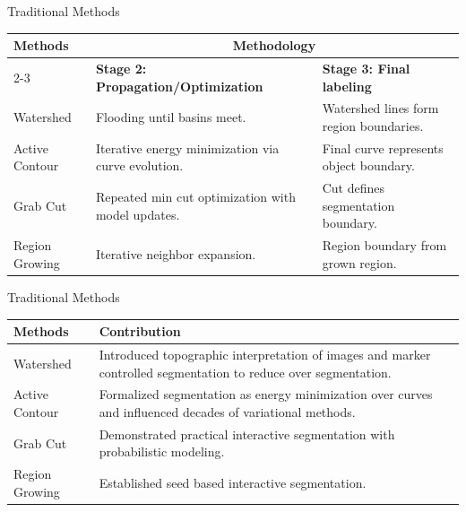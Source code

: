 \documentclass[11pt, aspectratio=169]{beamer}
\begin{document}
\begin{frame}{Traditional Methods} %
	\begin{table}[h]
		\centering
		\begin{tabular}{|l|p{5cm}|p{5cm}|}
			\hline
			\textbf{Methods} & \multicolumn{2}{c|}{\textbf{Methodology}} \\ \cline{2-3}
			& \textbf{Stage 2: Propagation/Optimization} & \textbf{Stage 3: Final labeling} \\ \hline
			
			Watershed 
			& Flooding until basins meet.
			& Watershed lines form region boundaries. \\ \hline
			
			Active Contour
			& Iterative energy minimization via curve evolution.
			& Final curve represents object boundary. \\ \hline
			
			Grab Cut
			& Repeated min cut optimization with model updates.
			& Cut defines segmentation boundary. \\ \hline
			
			Region Growing
			& Iterative neighbor expansion.
			& Region boundary from grown region. \\ \hline
			
		\end{tabular}
	\end{table}
	
\end{frame}

\begin{frame}{Traditional Methods} %
	\begin{table}[h]
		\centering
		\begin{tabular}{|l|p{10cm}|}
			\hline
			\textbf{Methods} & \textbf{Contribution} \\ \hline
			
			Watershed & Introduced topographic interpretation of images and marker controlled segmentation to reduce over segmentation. \\ \hline
			
			Active Contour & Formalized segmentation as energy minimization over curves and influenced decades of variational methods. \\ \hline
			
			Grab Cut & Demonstrated practical interactive segmentation with probabilistic modeling. \\ \hline
			
			Region Growing & Established seed based interactive segmentation. \\ \hline
			
		\end{tabular}
	\end{table}
\end{frame}
\end{document}
